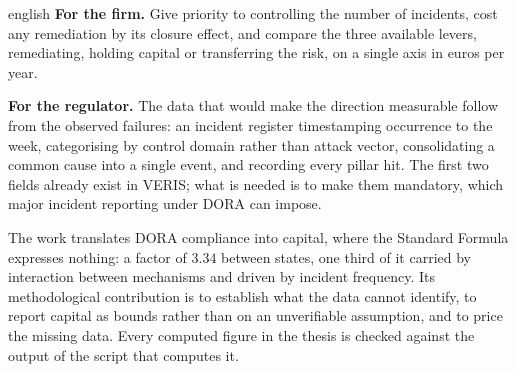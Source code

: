 \begin{otherlanguage*}{english}
\textbf{For the firm.} Give priority to controlling the number of incidents, cost any remediation by
its closure effect, and compare the three available levers, remediating, holding capital or
transferring the risk, on a single axis in euros per year.

\textbf{For the regulator.} The data that would make the direction measurable follow from the
observed failures: an incident register timestamping occurrence to the week, categorising by
control domain rather than attack vector, consolidating a common cause into a single event, and
recording every pillar hit. The
first two fields already exist in VERIS; what is needed is to make them mandatory, which major
incident reporting under DORA can impose.

The work translates DORA compliance into capital, where the Standard Formula expresses nothing: a
factor of $3.34$ between states, one third of it carried by interaction between mechanisms and
driven by incident frequency. Its methodological contribution is to establish what the data cannot
identify, to report capital as bounds rather than on an unverifiable assumption, and to price the
missing data. Every computed figure in the thesis is checked against the output of the script
that computes it.
\end{otherlanguage*}
